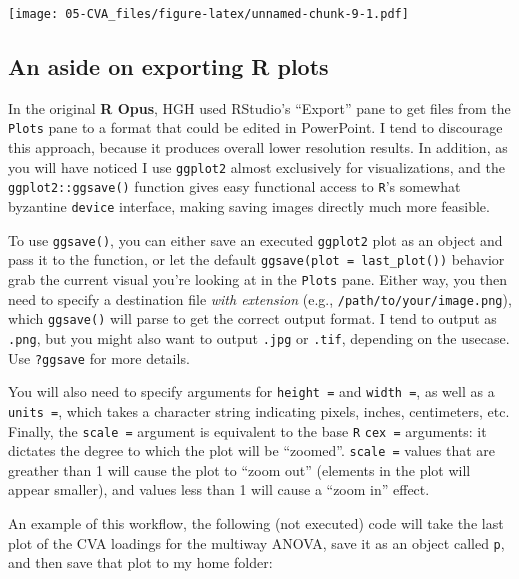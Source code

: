 \documentclass[
]{book}
\begin{document}
\texttt{[image: 05-CVA\_files/figure-latex/unnamed-chunk-9-1.pdf]}

\subsection{An aside on exporting R plots}\label{an-aside-on-exporting-r-plots}

In the original \textbf{R Opus}, HGH used RStudio's ``Export'' pane to get files from the \texttt{Plots} pane to a format that could be edited in PowerPoint. I tend to discourage this approach, because it produces overall lower resolution results. In addition, as you will have noticed I use \texttt{ggplot2} almost exclusively for visualizations, and the \texttt{ggplot2::ggsave()} function gives easy functional access to \texttt{R}'s somewhat byzantine \texttt{device} interface, making saving images directly much more feasible.

To use \texttt{ggsave()}, you can either save an executed \texttt{ggplot2} plot as an object and pass it to the function, or let the default \texttt{ggsave(plot\ =\ last\_plot())} behavior grab the current visual you're looking at in the \texttt{Plots} pane. Either way, you then need to specify a destination file \emph{with extension} (e.g., \texttt{/path/to/your/image.png}), which \texttt{ggsave()} will parse to get the correct output format. I tend to output as \texttt{.png}, but you might also want to output \texttt{.jpg} or \texttt{.tif}, depending on the usecase. Use \texttt{?ggsave} for more details.

You will also need to specify arguments for \texttt{height\ =} and \texttt{width\ =}, as well as a \texttt{units\ =}, which takes a character string indicating pixels, inches, centimeters, etc. Finally, the \texttt{scale\ =} argument is equivalent to the base \texttt{R} \texttt{cex\ =} arguments: it dictates the degree to which the plot will be ``zoomed''. \texttt{scale\ =} values that are greather than 1 will cause the plot to ``zoom out'' (elements in the plot will appear smaller), and values less than 1 will cause a ``zoom in'' effect.

An example of this workflow, the following (not executed) code will take the last plot of the CVA loadings for the multiway ANOVA, save it as an object called \texttt{p}, and then save that plot to my home folder:
\end{document}
